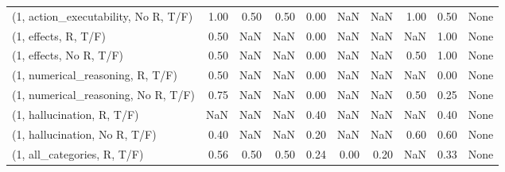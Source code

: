 \begin{table*}[h!]
\begin{adjustbox}{width=2\columnwidth,center}
\begin{tabular}{lrrr|rrr|rrr}
(1, action\_executability, No R, T/F) &                      1.00 &                  0.50 &                      0.50 &                          0.00 &                       NaN &                           NaN &                                   1.00 &                               0.50 &                                  None \\
(1, effects, R, T/F)                 &                      0.50 &                   NaN &                       NaN &                          0.00 &                       NaN &                           NaN &                                    NaN &                               1.00 &                                  None \\
(1, effects, No R, T/F)              &                      0.50 &                   NaN &                       NaN &                          0.00 &                       NaN &                           NaN &                                   0.50 &                               1.00 &                                  None \\
(1, numerical\_reasoning, R, T/F)     &                      0.50 &                   NaN &                       NaN &                          0.00 &                       NaN &                           NaN &                                    NaN &                               0.00 &                                  None \\
(1, numerical\_reasoning, No R, T/F)  &                      0.75 &                   NaN &                       NaN &                          0.00 &                       NaN &                           NaN &                                   0.50 &                               0.25 &                                  None \\
(1, hallucination, R, T/F)           &                       NaN &                   NaN &                       NaN &                          0.40 &                       NaN &                           NaN &                                    NaN &                               0.40 &                                  None \\
(1, hallucination, No R, T/F)        &                      0.40 &                   NaN &                       NaN &                          0.20 &                       NaN &                           NaN &                                   0.60 &                               0.60 &                                  None \\
(1, all\_categories, R, T/F)          &                      0.56 &                  0.50 &                      0.50 &                          0.24 &                      0.00 &                          0.20 &                                    NaN &                               0.33 &                                  None \\

\end{tabular}
\end{adjustbox}
\end{table*}
